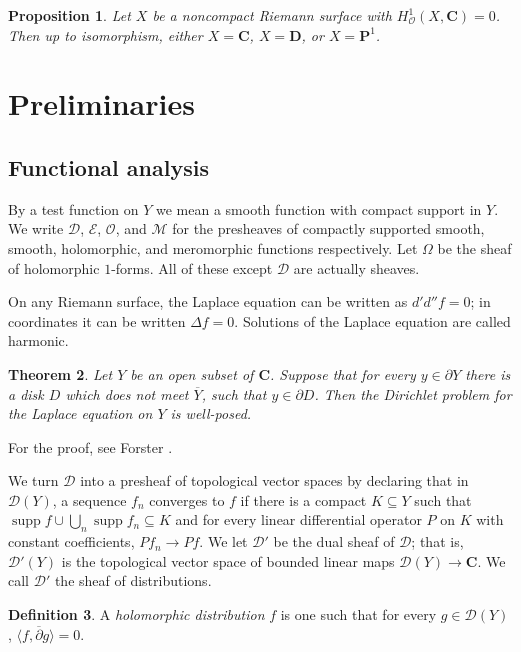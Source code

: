 \documentclass[reqno,12pt,letterpaper]{amsart}
\newcommand{\CC}{\mathbf{C}}
\newcommand{\DD}{\mathbf{D}}
\newcommand{\PP}{\mathbf P}
\DeclareMathOperator{\supp}{supp}
\newcommand{\dbar}{\overline \partial}
\newcommand{\dfn}[1]{\emph{#1}\index{#1}}
\newcommand{\Olo}{\mathscr O}
\newcommand{\Mero}{\mathscr M}
\newcommand{\Smooth}{\mathscr E}
\newcommand{\Test}{\mathscr D}
\newtheorem{theorem}{Theorem}[section]
\newtheorem{proposition}[theorem]{Proposition}
\theoremstyle{definition}
\newtheorem{definition}[theorem]{Definition}
\begin{document}
\begin{proposition}
\label{main prop}
Let $X$ be a noncompact Riemann surface with $H^1_\Olo(X, \CC) = 0$. Then up to isomorphism, either $X = \CC$, $X = \DD$, or $X = \PP^1$.
\end{proposition}

\section{Preliminaries}
\subsection{Functional analysis}
By a test function on $Y$ we mean a smooth function with compact support in $Y$.
We write $\Test$, $\Smooth$, $\Olo$, and $\Mero$ for the presheaves of compactly supported smooth, smooth, holomorphic, and meromorphic functions respectively.
Let $\Omega$ be the sheaf of holomorphic $1$-forms.
All of these except $\Test$ are actually sheaves.

On any Riemann surface, the Laplace equation can be written as $d'd''f = 0$; in coordinates it can be written $\Delta f = 0$.
Solutions of the Laplace equation are called harmonic.

\begin{theorem}
\label{solving the dirichlet problem}
Let $Y$ be an open subset of $\CC$.
Suppose that for every $y \in \partial Y$ there is a disk $D$ which does not meet $\overline Y$, such that $y \in \partial D$.
Then the Dirichlet problem for the Laplace equation on $Y$ is well-posed.
\end{theorem}

For the proof, see Forster \cite[Theorem 22.18]{gilligan2012lectures}.

We turn $\Test$ into a presheaf of topological vector spaces by declaring that in $\Test(Y)$, a sequence $f_n$ converges to $f$ if there is a compact $K \subseteq Y$ such that $\supp f \cup \bigcup_n \supp f_n \subseteq K$ and for every linear differential operator $P$ on $K$ with constant coefficients, $Pf_n \to Pf$.
We let $\Test'$ be the dual sheaf of $\Test$; that is, $\Test'(Y)$ is the topological vector space of bounded linear maps $\Test(Y) \to \CC$.
We call $\Test'$ the sheaf of distributions.

\begin{definition}
A \dfn{holomorphic distribution} $f$ is one such that for every $g \in \Test(Y)$, $\langle f, \dbar g\rangle = 0$.
\end{definition}
\end{document}
